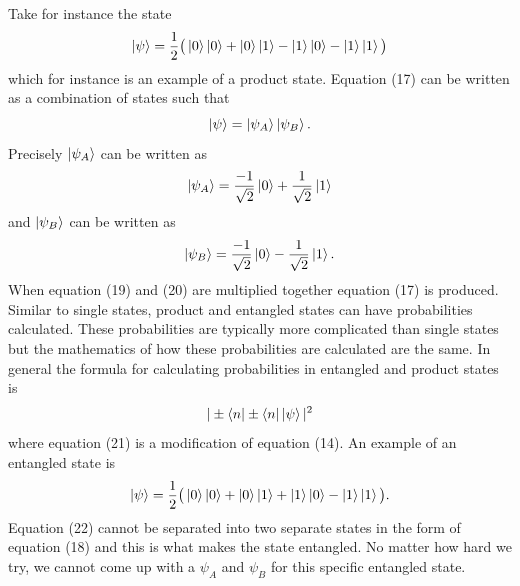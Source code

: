 \documentclass[twocolumn]{article}
\begin{document}
Take for instance the state
\begin{equation}
\ket{\psi}=\frac{1}{2}\big(\ket{0}\ket{0}+\ket{0}\ket{1}-\ket{1}\ket{0}-\ket{1}\ket{1}\big)
\end{equation}
which for instance is an example of a product state. Equation (17) can be written as a combination of states such that
\begin{equation}
\ket{\psi}=\ket{\psi_A}\ket{\psi_B}.
\end{equation}
Precisely $\ket{\psi_A}$ can be written as
\begin{equation}
\ket{\psi_A}=\frac{-1}{\sqrt{2}}\ket{0}+\frac{1}{\sqrt{2}}\ket{1}
\end{equation}
and $\ket{\psi_B}$ can be written as
\begin{equation}
\ket{\psi_B}=\frac{-1}{\sqrt{2}}\ket{0}-\frac{1}{\sqrt{2}}\ket{1}.
\end{equation}
When equation (19) and (20) are multiplied together equation (17) is produced. Similar to single states, product and entangled states can have probabilities calculated. These probabilities are typically more complicated than single states but the mathematics of how these probabilities are calculated are the same. In general the formula for calculating probabilities in entangled and product states is
\begin{equation}
|\pm\bra{n}\pm\bra{n}\ket{\psi}|^2
\end{equation}
where equation (21) is a modification of equation (14). An example of an entangled state is
\begin{equation}
\ket{\psi}=\frac{1}{2}\big(\ket{0}\ket{0}+\ket{0}\ket{1}+\ket{1}\ket{0}-\ket{1}\ket{1}\big).
\end{equation}
Equation (22) cannot be separated into two separate states in the form of equation (18) and this is what makes the state entangled. No matter how hard we try, we cannot come up with a $\psi_A$ and $\psi_B$ for this specific entangled state.
\end{document}
